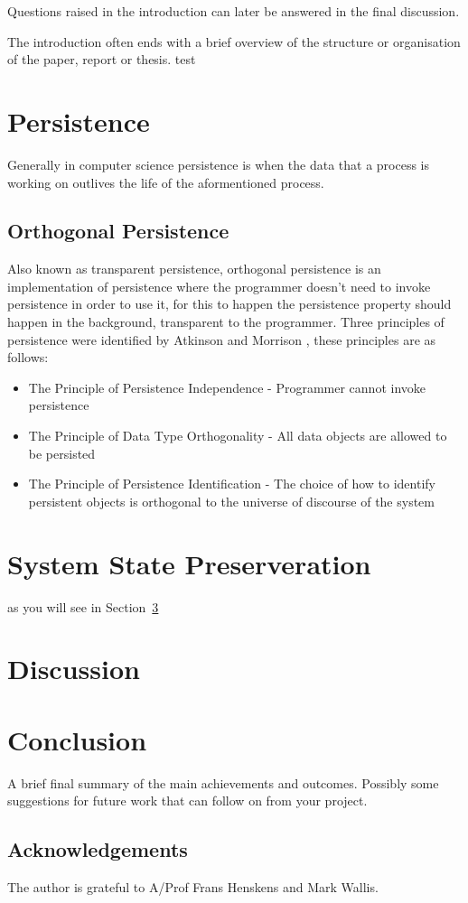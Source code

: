 \documentclass[a4,12pt]{article}
\begin{document}
Questions raised in the introduction can later be answered in the final discussion.

The introduction often ends with a brief overview of the structure or organisation of
the paper, report or thesis.
test~\citep{ADearle}
%
\section{Persistence}\label{sec:persistence}
Generally in computer science persistence is when the data that a process is working on outlives the life of the aformentioned process.
\subsection{Orthogonal Persistence}
Also known as transparent persistence, orthogonal persistence is an implementation of persistence where the programmer doesn't need to invoke persistence in order to use it, for this to happen the persistence property should happen in the background, transparent to the programmer.
Three principles of persistence were identified by Atkinson and Morrison \citep{Atkinson}, these principles are as follows:
\begin{itemize}
    \item{The Principle of Persistence Independence - Programmer cannot invoke persistence}
    \item{The Principle of Data Type Orthogonality - All data objects are allowed to be persisted}
    \item{The Principle of Persistence Identiﬁcation - The choice of how to identify persistent objects is orthogonal to the universe of discourse of the system}
\end{itemize}
\section{System State Preserveration}\label{sec:preservation}
as you will see in Section~\ref{sec:discussion}
\section{Discussion}\label{sec:discussion}
%
\section{Conclusion}
%
A brief final summary of the main achievements and outcomes. Possibly some suggestions for future work that can follow on from your project.%
%
\subsection*{Acknowledgements}
The author is grateful to A/Prof Frans Henskens and Mark Wallis.
%

\vskip 0.2in


\end{document}
